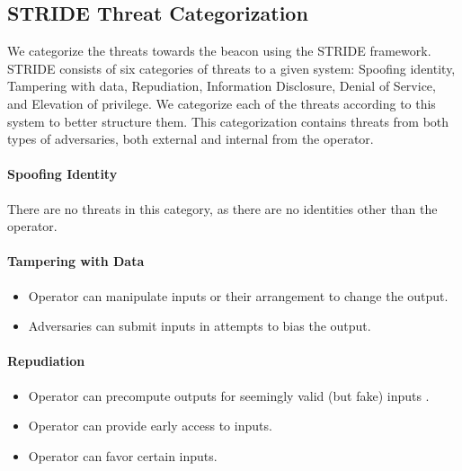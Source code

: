 \subsection{STRIDE Threat Categorization}

We categorize the threats towards the beacon using the STRIDE framework. STRIDE consists of six categories of threats to a given system: Spoofing identity, Tampering with data, Repudiation, Information Disclosure, Denial of Service, and Elevation of privilege. We categorize each of the threats according to this system to better structure them. This categorization contains threats from both types of adversaries, both external and internal from the operator.

\paragraph{Spoofing Identity} There are no threats in this category, as there are no identities other than the operator.


\paragraph{Tampering with Data}
\begin{itemize}
    \item Operator can manipulate inputs or their arrangement to change the output.
    \item Adversaries can submit inputs in attempts to bias the output.
\end{itemize}

\paragraph{Repudiation}
\begin{itemize}
    \item Operator can precompute outputs for seemingly valid (but fake) inputs .
    \item Operator can provide early access to inputs.
    \item Operator can favor certain inputs.
\end{itemize}
